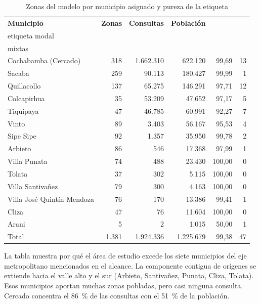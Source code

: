 \begin{table}[H]
  \centering
  \caption{Zonas del modelo por municipio asignado y pureza de la etiqueta}
  \label{tab:municipios}
  \interlineadoSimple
  \small
  \begin{tabular}{@{}lrrrrr@{}}
    \toprule
    \textbf{Municipio} & \textbf{Zonas} & \textbf{Consultas} & \textbf{Población} & \textbf{\celda{\% consultas con\\etiqueta modal}} & \textbf{\celda{Zonas\\mixtas}} \\
    \midrule
    Cochabamba (Cercado) & 318 & 1.662.310 & 622.120 & 99,69 & 13 \\
    Sacaba & 259 & 90.113 & 180.427 & 99,99 & 1 \\
    Quillacollo & 137 & 65.275 & 146.291 & 97,71 & 12 \\
    Colcapirhua & 35 & 53.209 & 47.652 & 97,17 & 5 \\
    Tiquipaya & 47 & 46.785 & 60.991 & 92,27 & 7 \\
    Vinto & 89 & 3.403 & 56.167 & 95,53 & 4 \\
    Sipe Sipe & 92 & 1.357 & 35.950 & 99,78 & 2 \\
    Arbieto & 86 & 546 & 17.368 & 97,99 & 1 \\
    Villa Punata & 74 & 488 & 23.430 & 100,00 & 0 \\
    Tolata & 37 & 302 & 5.115 & 100,00 & 0 \\
    Villa Santivañez & 79 & 300 & 4.163 & 100,00 & 0 \\
    Villa José Quintín Mendoza & 76 & 170 & 13.386 & 99,41 & 1 \\
    Cliza & 47 & 76 & 11.604 & 100,00 & 0 \\
    Arani & 5 & 2 & 1.015 & 50,00 & 1 \\
    \midrule
    Total & 1.381 & 1.924.336 & 1.225.679 & 99,38 & 47 \\
    \bottomrule
  \end{tabular}
\end{table}

La tabla muestra por qué el área de estudio excede los siete municipios del eje
metropolitano mencionados en el alcance. La componente contigua de orígenes se extiende
hacia el valle alto y el sur (Arbieto, Santivañez, Punata, Cliza, Tolata). Esos
municipios aportan muchas zonas pobladas, pero casi ninguna consulta. Cercado concentra el
86~\% de las consultas con el 51~\% de la población.

